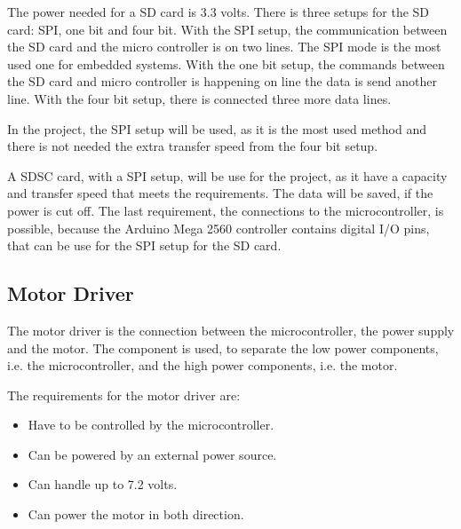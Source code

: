 \begin{minipage}{\linewidth}
\begin{minipage}{0.65\linewidth}
\begin{table} [H]
\begin{tabular}{|l|l|l|l|}
					
					
				\end{tabular}							
			\end{table}			
      \end{minipage}
  \end{minipage}



The power needed for a SD card is 3.3 volts. There is three setups for the SD card: SPI, one bit and four bit. With the SPI setup, the communication between the SD card and the micro controller is on two lines. The SPI mode is the most used one for embedded systems.
With the one bit setup, the commands between the SD card and micro controller is happening on line the data is send another line. With the four bit setup, there is connected three more data lines.

In the project, the SPI setup will be used, as it is the most used method and there is not needed the extra transfer speed from the four bit setup.


A SDSC card, with a SPI setup, will be use for the project, as it have a capacity and transfer speed that meets the requirements. The data will be saved, if the power is cut off. The last requirement, the connections to the microcontroller, is possible, because the Arduino Mega 2560 controller contains  digital I/O pins, that can be use for the SPI setup for the SD card.


\subsection{Motor Driver}
The motor driver is the connection between the microcontroller, the power supply and the motor. The component is used, to separate the low power components, i.e. the microcontroller, and the high power components, i.e. the motor.

The requirements for the motor driver are:
\begin{itemize}
\item Have to be controlled by the microcontroller.
\item Can be powered by an external power source.
\item Can handle up to 7.2 volts. 
\item Can power the motor in both direction.
\end{itemize}

